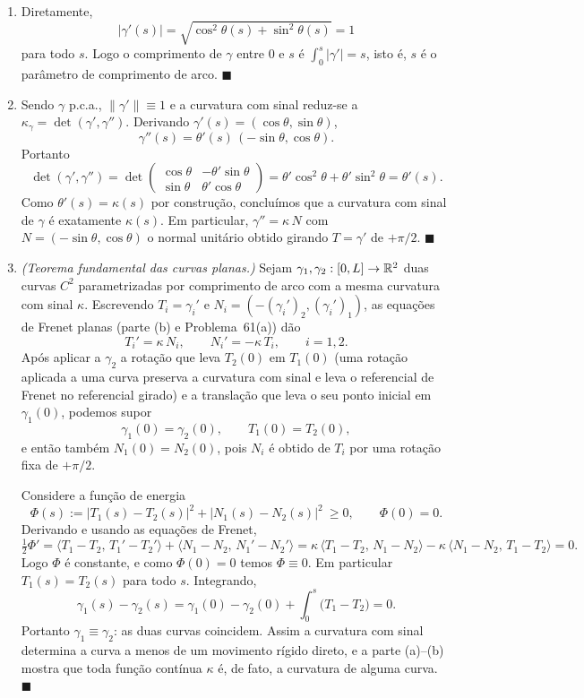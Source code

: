 \begin{enumerate}[label=(\alph*)]

\item Diretamente,
\[
|\gamma'(s)|=\sqrt{\cos^2\theta(s)+\sin^2\theta(s)}=1
\]
para todo $s$. Logo o comprimento de $\gamma$ entre $0$ e $s$ é $\int_0^s|\gamma'|=s$, isto é, $s$ é o parâmetro de comprimento de arco. \qquad$\blacksquare$

\item Sendo $\gamma$ p.c.a., $\|\gamma'\|\equiv1$ e a curvatura com sinal reduz-se a $\kappa_\gamma=\det(\gamma',\gamma'')$. Derivando $\gamma'(s)=(\cos\theta,\sin\theta)$,
\[
\gamma''(s)=\theta'(s)\,(-\sin\theta,\cos\theta).
\]
Portanto
\[
\det(\gamma',\gamma'')
=\det\begin{pmatrix}\cos\theta & -\theta'\sin\theta\\ \sin\theta & \theta'\cos\theta\end{pmatrix}
=\theta'\cos^2\theta+\theta'\sin^2\theta=\theta'(s).
\]
Como $\theta'(s)=\kappa(s)$ por construção, concluímos que a curvatura com sinal de $\gamma$ é exatamente $\kappa(s)$. Em particular, $\gamma''=\kappa\,N$ com $N=(-\sin\theta,\cos\theta)$ o normal unitário obtido girando $T=\gamma'$ de $+\pi/2$. \qquad$\blacksquare$

\item \emph{(Teorema fundamental das curvas planas.)} Sejam $\gamma_1,\gamma_2:[0,L]\to\mathbb{R}^2$ duas curvas $C^2$ parametrizadas por comprimento de arco com a mesma curvatura com sinal $\kappa$. Escrevendo $T_i=\gamma_i'$ e $N_i=(-(\gamma_i')_2,(\gamma_i')_1)$, as equações de Frenet planas (parte (b) e Problema~61(a)) dão
\[
T_i'=\kappa\,N_i,\qquad N_i'=-\kappa\,T_i,\qquad i=1,2.
\]
Após aplicar a $\gamma_2$ a rotação que leva $T_2(0)$ em $T_1(0)$ (uma rotação aplicada a uma curva preserva a curvatura com sinal e leva o referencial de Frenet no referencial girado) e a translação que leva o seu ponto inicial em $\gamma_1(0)$, podemos supor
\[
\gamma_1(0)=\gamma_2(0),\qquad T_1(0)=T_2(0),
\]
e então também $N_1(0)=N_2(0)$, pois $N_i$ é obtido de $T_i$ por uma rotação fixa de $+\pi/2$.

Considere a função de energia
\[
\Phi(s):=|T_1(s)-T_2(s)|^2+|N_1(s)-N_2(s)|^2\ \ge 0,\qquad \Phi(0)=0.
\]
Derivando e usando as equações de Frenet,
\[
\tfrac12\Phi'
=\langle T_1-T_2,\,T_1'-T_2'\rangle+\langle N_1-N_2,\,N_1'-N_2'\rangle
=\kappa\,\langle T_1-T_2,\,N_1-N_2\rangle-\kappa\,\langle N_1-N_2,\,T_1-T_2\rangle=0.
\]
Logo $\Phi$ é constante, e como $\Phi(0)=0$ temos $\Phi\equiv0$. Em particular $T_1(s)=T_2(s)$ para todo $s$. Integrando,
\[
\gamma_1(s)-\gamma_2(s)=\gamma_1(0)-\gamma_2(0)+\int_0^s\big(T_1-T_2\big)=0.
\]
Portanto $\gamma_1\equiv\gamma_2$: as duas curvas coincidem. Assim a curvatura com sinal determina a curva a menos de um movimento rígido direto, e a parte (a)--(b) mostra que toda função contínua $\kappa$ é, de fato, a curvatura de alguma curva. \qquad$\blacksquare$

\end{enumerate}


